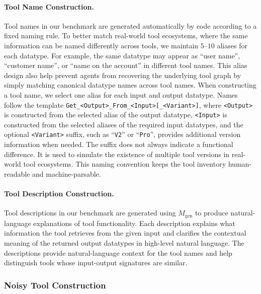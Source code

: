 \paragraph{Tool Name Construction.}
Tool names in our benchmark are generated automatically by code according to a fixed naming rule.
To better match real-world tool ecosystems, where the same information can be named differently across tools, we maintain $5$--$10$ aliases for each datatype.
For example, the same datatype may appear as ``user name'', ``customer name'', or ``name on the account'' in different tool names.
This alias design also help prevent agents from recovering the underlying tool graph by simply matching canonical datatype names across tool names.
When constructing a tool name, we select one alias for each input and output datatype.
Names follow the template \texttt{Get\_<Output>\_From\_<Input>[\_<Variant>]}, where \texttt{<Output>} is constructed from the selected alias of the output datatype, \texttt{<Input>} is constructed from the selected aliases of the required input datatypes, and the optional \texttt{<Variant>} suffix, such as ``\texttt{V2}'' or ``\texttt{Pro}'', provides additional version information when needed. 
The suffix does not always indicate a functional difference.
It is used to simulate the existence of multiple tool versions in real-world tool ecosystems.
This naming convention keeps the tool inventory human-readable and machine-parsable.

\paragraph{Tool Description Construction.}
Tool descriptions in our benchmark are generated using $M_{\mathrm{gen}}$ to produce natural-language explanations of tool functionality. 
Each description explains what information the tool retrieves from the given input and clarifies the contextual meaning of the returned output datatypes in high-level natural language. 
The descriptions provide natural-language context for the tool names and help distinguish tools whose input-output signatures are similar.

\subsubsection{Noisy Tool Construction}
\label{app:noisy_tool}

